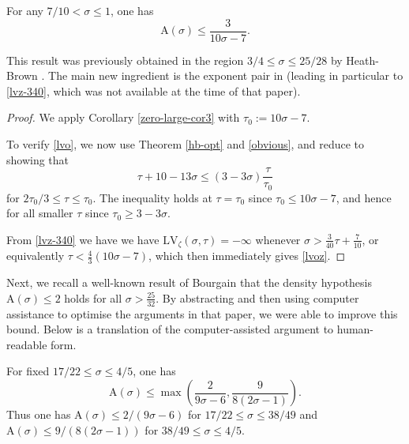 \documentclass[a4paper, 10pt]{amsart}
\newcommand{\LV}{\mathrm{LV}}
\newcommand{\A}{\mathrm{A}}
\begin{document}
\begin{theorem}\label{hb-density2} For any $7/10 < \sigma \leq 1$, one has $$\A(\sigma) \leq \frac{3}{10\sigma-7}.$$
\end{theorem}

This result was previously obtained in the region $3/4 \leq \sigma \leq 25/28$ by Heath-Brown \cite{heathbrown_zero_1979}.  The main new ingredient is the exponent pair in  (leading in particular to \eqref{lvz-340}, which was not available
at the time of that paper).

\begin{proof}  We apply Corollary \ref{zero-large-cor3} with $\tau_0 := 10\sigma-7$.

To verify \eqref{lvo}, we now use Theorem \ref{hb-opt} and \eqref{obvious}, and reduce to showing that
$$ \tau + 10-13\sigma \leq (3-3\sigma) \frac{\tau}{\tau_0}$$
for $2\tau_0/3 \leq \tau \leq \tau_0$.  The inequality holds at $\tau=\tau_0$ since $\tau_0 \leq 10\sigma-7$, and hence for all smaller $\tau$ since $\tau_0 \geq 3-3\sigma$.

From \eqref{lvz-340} we have we have $\LV_\zeta(\sigma,\tau) = -\infty$ whenever $\sigma > \frac{3}{40} \tau + \frac{7}{10}$, or equivalently $\tau < \frac{4}{3} (10\sigma-7)$, which then immediately gives \eqref{lvoz}.
\end{proof}

Next, we recall a well-known result of Bourgain \cite{bourgain_large_2000} that the density hypothesis $\A(\sigma) \leq 2$ holds for all $\sigma > \frac{25}{32}$.  By abstracting and then using computer assistance to optimise the arguments in that paper, we were able to improve this bound.  Below is a translation of the computer-assisted argument to human-readable form.

\begin{theorem}\label{bourgain-density-improved} For fixed $17/22 \leq \sigma \leq 4/5$, one has 
$$\A(\sigma) \leq \max\left(\frac{2}{9\sigma-6}, \frac{9}{8(2\sigma-1)}\right).$$
Thus one has $\A(\sigma) \leq 2/(9\sigma-6)$ for $17/22 \leq \sigma \leq 38/49$ and $\A(\sigma) \leq 9/(8(2\sigma-1))$ for $38/49 \leq \sigma \leq 4/5$.
\end{theorem}
\end{document}
